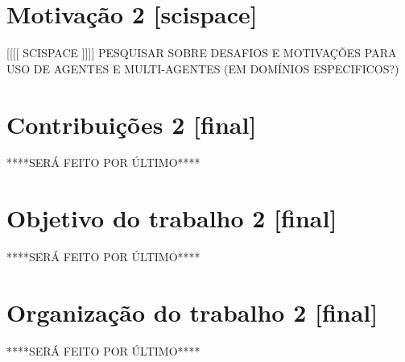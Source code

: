         

    \section{Motivação 2 [scispace]}

        [[[[ SCISPACE ]]]]
        PESQUISAR SOBRE DESAFIOS E MOTIVAÇÕES PARA USO DE AGENTES E MULTI-AGENTES (EM DOMÍNIOS ESPECIFICOS?)

    \section{Contribuições 2 [final]}
    
        ****SERÁ FEITO POR ÚLTIMO****
        
    \section{Objetivo do trabalho 2 [final]}

        ****SERÁ FEITO POR ÚLTIMO****

    \section{Organização do trabalho 2 [final]}

        ****SERÁ FEITO POR ÚLTIMO****
